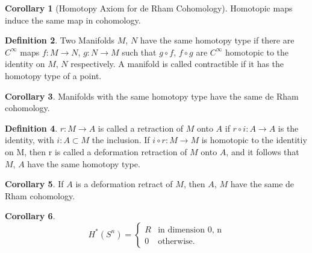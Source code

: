 \documentclass[twocolumn]{article}
\theoremstyle{definition}
\newtheorem{definition}{Definition}[section]
\newtheorem{corollary}[definition]{Corollary}
\theoremstyle{remark}
\begin{document}
\begin{corollary}[Homotopy Axiom for de Rham Cohomology]
    Homotopic maps induce the same map in cohomology.
\end{corollary}
\begin{definition}
    Two Manifolds $M$, $N$ have the same homotopy type if there are $C^\infty$ maps
    $f: M \rightarrow N$, $g: N \rightarrow M$ such that $g \circ f$, $f \circ g$ are $C^\infty$
    homotopic to the identity on $M$, $N$ respectively. A manifold is called contractible if it has the homotopy type of a point.
\end{definition}
\begin{corollary}
    Manifolds with the same homotopy type have the same de Rham cohomology.
\end{corollary}
\begin{definition}
    $r: M \rightarrow A$ is called a retraction of $M$ onto $A$ if $r \circ i: A \rightarrow A$ is the identity,
    with $i: A \subset M$ the inclusion. If $i \circ r: M \rightarrow M$ is homotopic to the identitiy on M,
    then r is called a deformation retraction of $M$ onto $A$, and it follows that $M$, $A$ have the same homotopy type.
\end{definition}
\begin{corollary}
    If $A$ is a deformation retract of $M$, then $A$, $M$ have the same de Rham cohomology.
\end{corollary}
\begin{corollary}
    \begin{equation}
        H^*(S^n) =
        \begin{cases}
            R & \textrm{in dimension 0, n}\\
            0 & \textrm{otherwise.}
        \end{cases}
    \end{equation}
\end{corollary}
\end{document}

